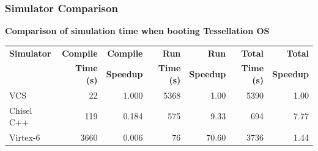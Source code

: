 \documentclass[xcolor=pdflatex,dvipsnames,table]{beamer}
\begin{document}
\begin{frame}[fragile]
\frametitle{Simulator Comparison}

\textbf{Comparison of simulation time when booting Tessellation OS}
\vskip0.5cm

\begin{footnotesize}
\begin{tabular}{lrrrrrr}
\textbf{Simulator} & \textbf{Compile}  & \textbf{Compile} & \textbf{Run}  & \textbf{Run} & \textbf{Total} & \textbf{Total} \\
& \textbf{Time (s)}  & \textbf{Speedup} & \textbf{Time (s)}  & \textbf{Speedup} & \textbf{Time (s)} & \textbf{Speedup} \\
\hline
VCS             &   22 & 1.000 & 5368 & 1.00 & 5390 & 1.00 \\ 
Chisel C++  & 119 & 0.184 & 575 & 9.33 & 694 & 7.77\\
Virtex-6 & 3660 & 0.006 & 76 & 70.60 & 3736 & 1.44\\
\end{tabular}
\end{footnotesize}


\end{frame}
\end{document}
